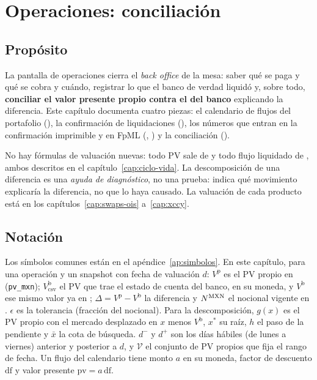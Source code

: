 \chapter{Operaciones: conciliación}\label{cap:operaciones}

\section{Propósito}\label{sec:cap11-proposito}

La pantalla de operaciones cierra el \emph{back office} de la mesa: saber qué se paga y qué se cobra y cuándo, registrar lo que el banco de verdad liquidó y, sobre todo, \textbf{conciliar el valor presente propio contra el del banco} explicando la diferencia. Este capítulo documenta cuatro piezas: el calendario de flujos del portafolio (), la confirmación de liquidaciones (), los números que entran en la confirmación imprimible y en FpML (, ) y la conciliación ().

No hay fórmulas de valuación nuevas: todo PV sale de  y todo flujo liquidado de , ambos descritos en el capítulo~\ref{cap:ciclo-vida}. La descomposición de una diferencia es una \emph{ayuda de diagnóstico}, no una prueba: indica qué movimiento explicaría la diferencia, no que lo haya causado. La valuación de cada producto está en los capítulos~\ref{cap:swaps-ois} a~\ref{cap:xccy}.

\section{Notación}\label{sec:cap11-notacion}

Los símbolos comunes están en el apéndice~\ref{ap:simbolos}. En este capítulo, para una operación y un snapshot con fecha de valuación $d$: $V^{\mathrm{p}}$ es el PV propio en \MXN (\texttt{pv\_mxn}); $V^{\mathrm{b}}_{\mathrm{csv}}$ el PV que trae el estado de cuenta del banco, en su moneda, y $V^{\mathrm{b}}$ ese mismo valor ya en \MXN; $\Delta = V^{\mathrm{p}} - V^{\mathrm{b}}$ la diferencia y $N^{\textup{MXN}}$ el nocional vigente en \MXN. $\epsilon$ es la tolerancia (fracción del nocional). Para la descomposición, $g(x)$ es el PV propio con el mercado desplazado en $x$ menos $V^{\mathrm{b}}$, $x^{*}$ su raíz, $h$ el paso de la pendiente y $\bar{x}$ la cota de búsqueda. $d^{-}$ y $d^{+}$ son los días hábiles (de lunes a viernes) anterior y posterior a $d$, y $\mathcal{V}$ el conjunto de PV propios que fija el rango de fecha. Un flujo del calendario tiene monto $a$ en su moneda, factor de descuento $\mathrm{df}$ y valor presente $\mathrm{pv} = a\,\mathrm{df}$.

